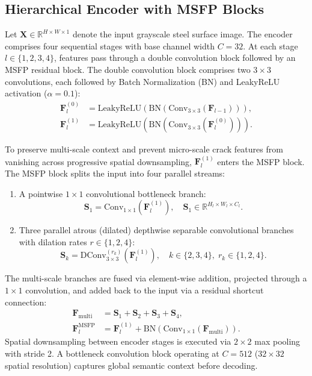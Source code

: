 \documentclass{ieeeaccess}
\begin{document}
\subsection{Hierarchical Encoder with MSFP Blocks}
\label{sec:msfp_module}
Let $\mathbf{X} \in \mathbb{R}^{H \times W \times 1}$ denote the input grayscale steel surface image. The encoder comprises four sequential stages with base channel width $C = 32$. At each stage $l \in \{1, 2, 3, 4\}$, features pass through a double convolution block followed by an MSFP residual block. The double convolution block comprises two $3 \times 3$ convolutions, each followed by Batch Normalization (BN) and LeakyReLU activation ($\alpha = 0.1$):
\begin{align}
  \mathbf{F}_l^{(0)} &= \text{LeakyReLU}\left(\text{BN}\left(\text{Conv}_{3\times 3}(\mathbf{F}_{l-1})\right)\right), \\
  \mathbf{F}_l^{(1)} &= \text{LeakyReLU}\left(\text{BN}\left(\text{Conv}_{3\times 3}(\mathbf{F}_l^{(0)})\right)\right).
\end{align}

To preserve multi-scale context and prevent micro-scale crack features from vanishing across progressive spatial downsampling, $\mathbf{F}_l^{(1)}$ enters the MSFP block. The MSFP block splits the input into four parallel streams:
\begin{enumerate}
    \item A pointwise $1 \times 1$ convolutional bottleneck branch:
    \begin{equation}
      \mathbf{S}_1 = \text{Conv}_{1 \times 1}(\mathbf{F}_l^{(1)}), \quad \mathbf{S}_1 \in \mathbb{R}^{H_l \times W_l \times C_l}.
    \end{equation}
    \item Three parallel atrous (dilated) depthwise separable convolutional branches with dilation rates $r \in \{1, 2, 4\}$:
    \begin{equation}
      \mathbf{S}_k = \text{DConv}_{3 \times 3}^{(r_k)}(\mathbf{F}_l^{(1)}), \quad k \in \{2, 3, 4\}, \; r_k \in \{1, 2, 4\}.
    \end{equation}
\end{enumerate}
The multi-scale branches are fused via element-wise addition, projected through a $1 \times 1$ convolution, and added back to the input via a residual shortcut connection:
\begin{align}
  \mathbf{F}_{\text{multi}} &= \mathbf{S}_1 + \mathbf{S}_2 + \mathbf{S}_3 + \mathbf{S}_4, \\
  \mathbf{F}_l^{\text{MSFP}} &= \mathbf{F}_l^{(1)} + \text{BN}\left(\text{Conv}_{1 \times 1}(\mathbf{F}_{\text{multi}})\right).
\end{align}
Spatial downsampling between encoder stages is executed via $2 \times 2$ max pooling with stride 2. A bottleneck convolution block operating at $C = 512$ ($32 \times 32$ spatial resolution) captures global semantic context before decoding.
\end{document}
